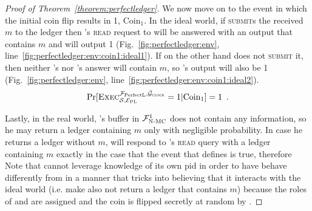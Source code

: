 \begin{proof}[Proof of Theorem~\ref{theorem:perfectledger}]
    We now move on to the event in which the initial coin flip results in 1,
    $\mathrm{Coin}_1$. In the ideal world, if \simulator{} \textsc{submit}s the
    received $m$ to the ledger then \environment's \textsc{read} request to
    \bob{} will be answered with an output that contains $m$ and \environment{}
    will output 1 (Fig.~\ref{fig:perfectledger:env},
    line~\ref{fig:perfectledger:env:coin1:ideal1}). If on the other hand
    \simulator{} does not \textsc{submit} it, then neither \bob's nor \alice's
    answer will contain $m$, so \environment's output will also be 1
    (Fig.~\ref{fig:perfectledger:env},
    line~\ref{fig:perfectledger:env:coin1:ideal2}).
    \begin{equation*}
      \Pr[\textsc{Exec}^{\mathcal{F}_{\mathrm{PerfectL}}, \bar{\mathcal{G}}_{\textsc{clock}}}_{\mathcal{S}, \mathcal{E}_{\mathrm{PL}}} = 1
      | \mathrm{Coin}_1] = 1 \enspace.
    \end{equation*}

    Lastly, in the real world, \bob's buffer in $\mathcal{F}_{\textsc{N-MC}}^1$ does not
    contain any information, so he may return a ledger containing $m$ only with
    negligible probability. In case he returns a ledger without $m$, \alice{}
    will respond to \environment's \textsc{read} query with a ledger containing
    $m$ exactly in the case that the event that defines \ppfetches{} is true,
    therefore
    Note that \perfectprot{} cannot leverage knowledge of its own pid in order
    to have \alice{} behave differently from \bob{} in a manner that tricks
    \perfectenv{} into believing that it interacts with the ideal world (i.e.
    make \alice{} also not return a ledger that contains $m$) because the roles
    of \alice{} and \bob{} are assigned and the coin is flipped secretly at
    random by \perfectenv.


\end{proof}
